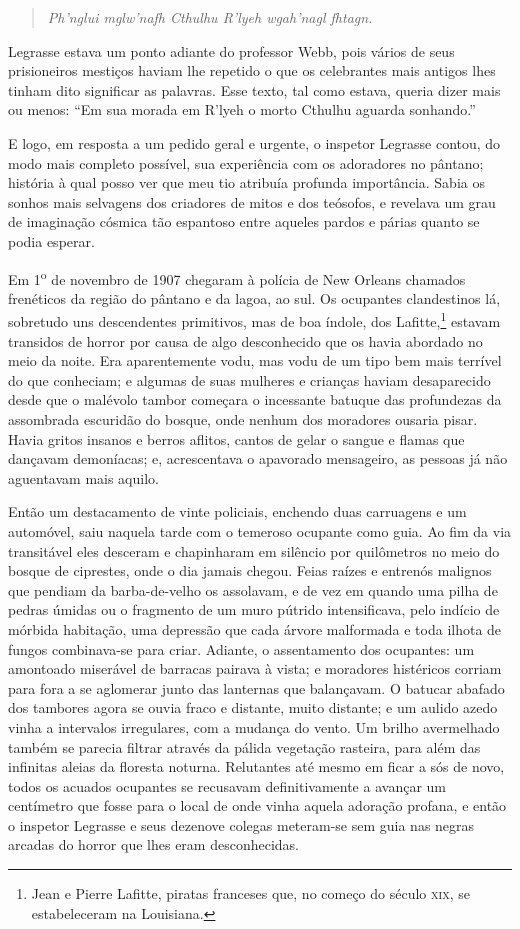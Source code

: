 \begin{verse}
\emph{Ph'nglui mglw'nafh Cthulhu R'lyeh wgah'nagl fhtagn.}
\end{verse}

Legrasse estava um ponto adiante do professor Webb, pois vários de
seus prisioneiros mestiços haviam lhe repetido o que os celebrantes mais antigos
lhes tinham dito significar as palavras. Esse texto, tal
como estava, queria dizer mais ou menos: ``Em sua morada em R'lyeh o morto Cthulhu aguarda sonhando.''


E logo, em resposta a um pedido geral e urgente, o inspetor Legrasse
contou, do modo mais completo possível, sua experiência com os
adoradores no pântano; história à qual posso ver que meu tio atribuía
profunda importância. Sabia os sonhos mais selvagens dos criadores de
mitos e dos teósofos, e revelava um grau de imaginação cósmica tão
espantoso entre aqueles pardos e párias quanto se podia esperar.

Em 1\textsuperscript{o} de novembro de 1907 chegaram à polícia de
New Orleans chamados frenéticos da região do pântano e da lagoa, ao sul.
Os ocupantes clandestinos lá, sobretudo uns descendentes primitivos, mas
de boa índole, dos Lafitte,\footnote{Jean e Pierre Lafitte, piratas
  franceses que, no começo do século \textsc{xix}, se estabeleceram na Louisiana.}
estavam transidos de horror por causa de algo desconhecido que os havia
abordado no meio da noite. Era aparentemente vodu, mas vodu de um tipo
bem mais terrível do que conheciam; e algumas de suas mulheres e
crianças haviam desaparecido desde que o malévolo tambor começara o
incessante batuque das profundezas da assombrada escuridão do bosque,
onde nenhum dos moradores ousaria pisar. Havia gritos insanos e berros
aflitos, cantos de gelar o sangue e flamas que dançavam demoníacas; e,
acrescentava o apavorado mensageiro, as pessoas já não aguentavam mais
aquilo.

Então um destacamento de vinte policiais, enchendo duas carruagens e um
automóvel, saiu naquela tarde com o temeroso ocupante como guia. Ao fim
da via transitável eles desceram e chapinharam em silêncio por quilômetros
no meio do bosque de ciprestes, onde o dia jamais chegou. Feias raízes e
entrenós malignos que pendiam da barba-de-velho os assolavam, e de vez
em quando uma pilha de pedras úmidas ou o fragmento de um muro pútrido
intensificava, pelo indício de mórbida habitação, uma depressão que cada
árvore malformada e toda ilhota de fungos combinava-se para criar.
Adiante, o assentamento dos ocupantes: um amontoado miserável de
barracas pairava à vista; e moradores histéricos corriam para fora a se
aglomerar junto das lanternas que balançavam. O batucar abafado dos
tambores agora se ouvia fraco e distante, muito distante; e um aulido
azedo vinha a intervalos irregulares, com a mudança do vento. Um brilho
avermelhado também se parecia filtrar através da pálida vegetação
rasteira, para além das infinitas aleias da floresta noturna. Relutantes
até mesmo em ficar a sós de novo, todos os acuados ocupantes se
recusavam definitivamente a avançar um centímetro que fosse para o local de onde
vinha aquela adoração profana, e então o inspetor Legrasse e seus
dezenove colegas meteram-se sem guia nas negras arcadas do horror que
lhes eram desconhecidas.

